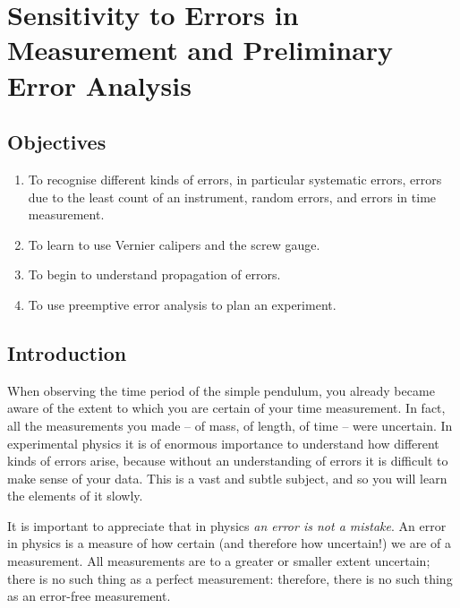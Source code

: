 
\chapter{Sensitivity to Errors in Measurement and Preliminary Error Analysis}

\section{Objectives}

\begin{enumerate}
    \item To recognise different kinds of errors, in particular systematic errors, errors due to the least count of an instrument, random errors, and errors in time measurement.
    \item To learn to use Vernier calipers and the screw gauge.
    \item To begin to understand propagation of errors. 
    \item To use preemptive error analysis to plan an experiment. 
    
\end{enumerate}

\section{Introduction}

When observing the time period of the simple pendulum, you already became aware of the extent to which you are certain of your time measurement. In fact, all the measurements you made -- of mass, of length, of time -- were uncertain. In experimental physics it is of enormous importance to understand how different kinds of errors arise, because without an understanding of errors it is difficult to make sense of your data. This is a vast and subtle subject, and so you will learn the elements of it slowly.

It is important to appreciate that in physics \textit{an error is not a mistake}. An error in physics is a measure of how certain (and therefore how uncertain!) we are of a measurement. All measurements are to a greater or smaller extent uncertain; there is no such thing as a perfect measurement: therefore, there is no such thing as an error-free measurement. 

